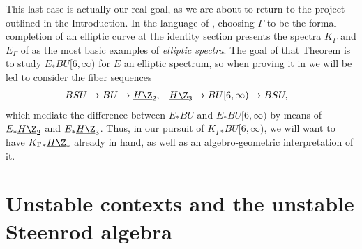 This last case is actually our real goal, as we are about to return to the project outlined in the Introduction.  In the language of , choosing $\Gamma$ to be the formal completion of an elliptic curve at the identity section presents the spectra $K_\Gamma$ and $E_\Gamma$ of  as the most basic examples of \textit{elliptic spectra}.  The goal of that Theorem is to study $E_* BU[6, \infty)$ for $E$ an elliptic spectrum, so when proving it in  we will be led to consider the fiber sequences
\begin{align*}
BSU \to BU & \to \OS{H\Z}{2}, & \OS{H\Z}{3} \to BU[6, \infty) & \to BSU,
\end{align*}
which mediate the difference between $E_* BU$ and $E_* BU[6, \infty)$ by means of $E_* \OS{H\Z}{2}$ and $E_* \OS{H\Z}{3}$.  Thus, in our pursuit of $K_\Gamma{}_* BU[6, \infty)$, we will want to have $K_\Gamma{}_* \OS{H\Z}{*}$ already in hand, as well as an algebro-geometric interpretation of it.









\section{Unstable contexts and the unstable Steenrod algebra}\label{UnstableContextsSection}

